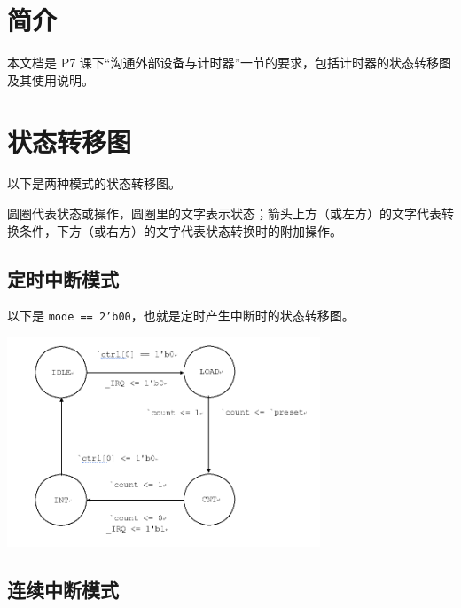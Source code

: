 \documentclass[12pt,AutoFakeBold,AutoFakeSlant]{article}
\newcommand{\ms}[1]{\texttt{#1}}
\begin{document}
{
\setlength{\parskip}{\baselineskip}%

\begin{center}
\end{center}
}

\tableofcontents
\newpage

\section{简介}

本文档是 P7 课下“沟通外部设备与计时器”一节的要求，包括计时器的状态转移图及其使用说明。

\section{状态转移图}

以下是两种模式的状态转移图。

圆圈代表状态或操作，圆圈里的文字表示状态；箭头上方（或左方）的文字代表转换条件，下方（或右方）的文字代表状态转换时的附加操作。

\subsection{定时中断模式}

以下是 \ms{mode == 2'b00}，也就是定时产生中断时的状态转移图。

\begin{center}
 \includegraphics[width=0.7\textwidth]{pipelined3-timer-1.png}
\end{center}

\subsection{连续中断模式}
\end{document}
